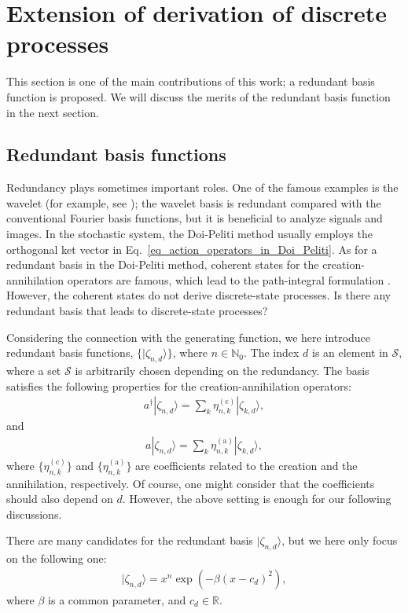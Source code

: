 \documentclass[sn-mathphys,Numbered]{sn-jnl}%
\theoremstyle{thmstyleone}%
\theoremstyle{thmstyletwo}%
\theoremstyle{thmstylethree}%
\begin{document}
\section{Extension of derivation of discrete processes}

This section is one of the main contributions of this work; a redundant basis function is proposed. We will discuss the merits of the redundant basis function in the next section.

\subsection{Redundant basis functions}

Redundancy plays sometimes important roles. One of the famous examples is the wavelet (for example, see \cite{Starck2015}); the wavelet basis is redundant compared with the conventional Fourier basis functions, but it is beneficial to analyze signals and images. In the stochastic system, the Doi-Peliti method usually employs the orthogonal ket vector in Eq.~\eqref{eq_action_operators_in_Doi_Peliti}. As for a redundant basis in the Doi-Peliti method, coherent states for the creation-annihilation operators are famous, which lead to the path-integral formulation \cite{Weber2017}. However, the coherent states do not derive discrete-state processes. Is there any redundant basis that leads to discrete-state processes?


Considering the connection with the generating function, we here introduce redundant basis functions, $\{|\zeta_{n,d} \rangle\}$, where $n \in \mathbb{N}_0$. The index $d$ is an element in $\mathcal{S}$, where a set $\mathcal{S}$ is arbitrarily chosen depending on the redundancy. The basis satisfies the following properties for the creation-annihilation operators:
\begin{align}
a^\dagger |\zeta_{n,d} \rangle = \sum_{k} \eta^{\mathrm{(c)}}_{n,k} |\zeta_{k,d} \rangle,
\end{align}
and
\begin{align}
a |\zeta_{n,d} \rangle = \sum_{k} \eta^{\mathrm{(a)}}_{n,k} |\zeta_{k,d} \rangle,
\end{align}
where $\{\eta^{\mathrm{(c)}}_{n,k}\}$ and $\{\eta^{\mathrm{(a)}}_{n,k}\}$ are coefficients related to the creation and the annihilation, respectively. Of course, one might consider that the coefficients should also depend on $d$. However, the above setting is enough for our following discussions.


There are many candidates for the redundant basis  $|\zeta_{n,d} \rangle$, but we here only focus on the following one:
\begin{align}
|\zeta_{n,d} \rangle = x^n \exp\left( - \beta ( x - c_d )^2 \right),
\label{eq_gaussian_redundant_basis}
\end{align}
where $\beta$ is a common parameter, and $c_d \in \mathbb{R}$. 
\end{document}

